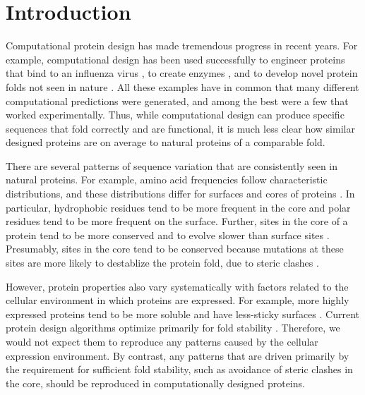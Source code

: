 \documentclass[12pt]{article}
\begin{document}
\section{Introduction}
\label{Introduction}

Computational protein design has made tremendous progress in recent years. For example, computational design has been used successfully to engineer proteins that bind to an influenza virus \citep{Fleishman2011}, to create enzymes \citep{Rothlisberger2008}, and to develop novel protein folds not seen in nature \citep{Kuhlman2003}. All these examples have in common that many different computational predictions were generated, and among the best were a few that worked experimentally. Thus, while computational design can produce specific sequences that fold correctly and are functional, it is much less clear how similar designed proteins are on average to natural proteins of a comparable fold.

There are several patterns of sequence variation that are consistently seen in natural proteins. For example, amino acid frequencies follow characteristic distributions, and these distributions differ for surfaces and cores of proteins \citep{Overington1992,Porto2004,Bastolla2005,Moelbertetal2004}. In particular, hydrophobic residues tend to be more frequent in the core and polar residues tend to be more frequent on the surface. Further, sites in the core of a protein tend to be more conserved and to evolve slower than surface sites \citep{MirnyShakhnovich1999,Goldman1998,Bustamante2000,Conant2009,Franzosa2009,Ramsey2011,Scherreretal2012,MeyerWilke2012}. Presumably, sites in the core tend to be conserved because mutations at these sites are more likely to destablize the protein fold, due to steric clashes \citep{ChothiaFinkelstein1990}.

However, protein properties also vary systematically with factors related to the cellular environment in which proteins are expressed. For example, more highly expressed proteins tend to be more soluble and have less-sticky surfaces \citep{Tartagliaetal2007,Levyetal2012}. Current protein design algorithms optimize primarily for fold stability \citep{Kuhlman2000}. Therefore, we would not expect them to reproduce any patterns caused by the cellular expression environment. By contrast, any patterns that are driven primarily by the requirement for sufficient fold stability, such as avoidance of steric clashes in the core, should be reproduced in computationally designed proteins.
\end{document}
